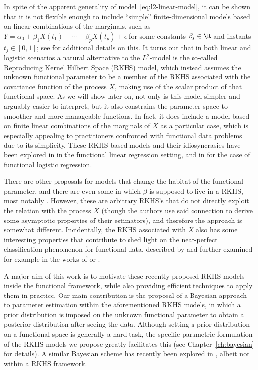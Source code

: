 In spite of the apparent generality of model~\eqref{eq:l2-linear-model}, it can be shown that it is not flexible enough to include ``simple'' finite-dimensional models based on linear combinations of the marginals, such as \(Y=\alpha_0 + \beta_1 X(t_1)+ \cdots + \beta_p X(t_p) + \epsilon\) for some constants \(\beta_j\in\R\) and instants \(t_j\in[0,1]\); see \citet{berrendero2020general} for additional details on this. It turns out that in both linear and logistic scenarios a natural alternative to the \(L^2\)-model is the so-called Reproducing Kernel Hilbert Space (RKHS) model, which instead assumes the unknown functional parameter to be a member of the RKHS associated with the covariance function of the process \(X\), making use of the scalar product of that functional space. As we will show later on, not only is this model simpler and arguably easier to interpret, but it also constrains the parameter space to smoother and more manageable functions. In fact, it does include a model based on finite linear combinations of the marginals of \(X\) as a particular case, which is especially appealing to practitioners confronted with functional data problems due to its simplicity. These RKHS-based models and their idiosyncrasies have been explored in \citet{berrendero2019rkhs, berrendero2020general} in the functional linear regression setting, and in \citet{berrendero2018functional, berrendero2018use} for the case of functional logistic regression.

There are other proposals for models that change the habitat of the functional parameter, and there are even some in which \(\beta\) is supposed to live in a RKHS, most notably \citet{yuan2010reproducing}. However, these are arbitrary RKHS's that do not directly exploit the relation with the process \(X\) (though the authors use said connection to derive some asymptotic properties of their estimators), and therefore the approach is somewhat different. Incidentally, the RKHS associated with \(X\) also has some interesting properties that contribute to shed light on the near-perfect classification phenomenon for functional data, described by \citet{delaigle2012achieving} and further examined for example in the works of \citet{berrendero2018use} or \citet{torrecilla2020optimal}.

A major aim of this work is to motivate these recently-proposed RKHS models inside the functional framework, while also providing efficient techniques to apply them in practice. Our main contribution is the proposal of a Bayesian approach to parameter estimation within the aforementioned RKHS models, in which a prior distribution is imposed on the unknown functional parameter to obtain a posterior distribution after seeing the data. Although setting a prior distribution on a functional space is generally a hard task, the specific parametric formulation of the RKHS models we propose greatly facilitates this (see Chapter~\ref{ch:bayesian} for details). A similar Bayesian scheme has recently been explored in \citet{grollemund2019bayesian}, albeit not within a RKHS framework.

